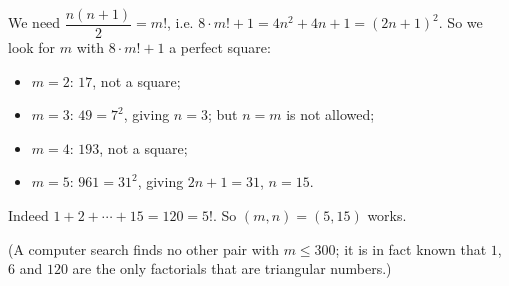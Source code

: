 We need $\dfrac{n(n+1)}2=m!$, i.e. $8\cdot m!+1=4n^2+4n+1=(2n+1)^2$. So we look for $m$ with $8\cdot m!+1$ a perfect square:
\begin{itemize}
\item $m=2$: $17$, not a square;
\item $m=3$: $49=7^2$, giving $n=3$; but $n=m$ is not allowed;
\item $m=4$: $193$, not a square;
\item $m=5$: $961=31^2$, giving $2n+1=31$, $n=15$.
\end{itemize}
Indeed $1+2+\cdots+15=120=5!$. So $\boxed{(m,n)=(5,15)}$ works.

(A computer search finds no other pair with $m\le300$; it is in fact known that $1$, $6$ and $120$ are the only factorials that are triangular numbers.)
